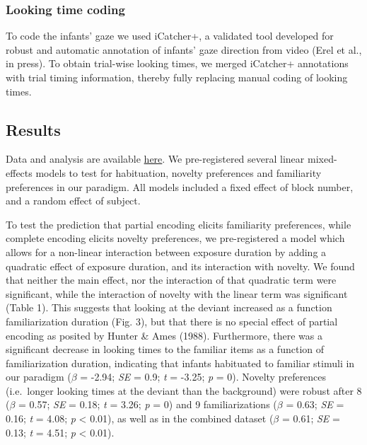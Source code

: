 \documentclass[10pt, letterpaper]{article}
\begin{document}
\hypertarget{looking-time-coding}{%
\subsubsection{Looking time coding}\label{looking-time-coding}}

To code the infants' gaze we used iCatcher+, a validated tool developed
for robust and automatic annotation of infants' gaze direction from
video (Erel et al., in press). To obtain trial-wise looking times, we
merged iCatcher+ annotations with trial timing information, thereby
fully replacing manual coding of looking times.

\hypertarget{results-1}{%
\subsection{Results}\label{results-1}}

Data and analysis are available
\href{https://tinyurl.com/PokebabyCogSci2023}{here}. We pre-registered
several linear mixed-effects models to test for habituation, novelty
preferences and familiarity preferences in our paradigm. All models
included a fixed effect of block number, and a random effect of subject.

To test the prediction that partial encoding elicits familiarity
preferences, while complete encoding elicits novelty preferences, we
pre-registered a model which allows for a non-linear interaction between
exposure duration by adding a quadratic effect of exposure duration, and
its interaction with novelty. We found that neither the main effect, nor
the interaction of that quadratic term were significant, while the
interaction of novelty with the linear term was significant (Table 1).
This suggests that looking at the deviant increased as a function
familiarization duration (Fig. 3), but that there is no special effect
of partial encoding as posited by Hunter \& Ames (1988). Furthermore,
there was a significant decrease in looking times to the familiar items
as a function of familiarization duration, indicating that infants
habituated to familiar stimuli in our paradigm (\(\beta\) = -2.94;
\emph{SE} = 0.9; \emph{t} = -3.25; \emph{p} = 0). Novelty preferences
(i.e.~longer looking times at the deviant than the background) were
robust after 8 (\(\beta\) = 0.57; \emph{SE} = 0.18; \emph{t} = 3.26;
\emph{p} = 0) and 9 familiarizations (\(\beta\) = 0.63; \emph{SE} =
0.16; \emph{t} = 4.08; \emph{p} \textless{} 0.01), as well as in the
combined dataset (\(\beta\) = 0.61; \emph{SE} = 0.13; \emph{t} = 4.51;
\emph{p} \textless{} 0.01).
\end{document}

